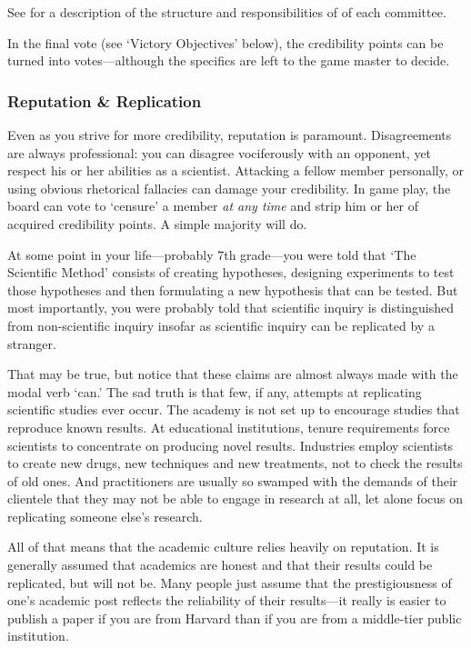 \begin{refsection}
See  for a description of the structure and responsibilities of of each committee.

In the final vote (see `Victory Objectives' below), the credibility points can be turned into votes—although the specifics are left to the game master to decide. 

\subsubsection{Reputation \& Replication}
\label{reputationreplication}

Even as you strive for more credibility, reputation is paramount. Disagreements are always professional: you can disagree vociferously with an opponent, yet respect his or her abilities as a scientist. Attacking a fellow member personally, or using obvious rhetorical fallacies can damage your credibility. In game play, the board can vote to ‘censure’ a member \emph{at any time} and strip him or her of acquired credibility points. A simple majority will do.

At some point in your life---probably 7th grade---you were told that `The Scientific Method' consists of creating hypotheses, designing experiments to test those hypotheses and then formulating a new hypothesis that can be tested. But most importantly, you were probably told that scientific inquiry is distinguished from non-scientific inquiry insofar as scientific inquiry can be replicated by a stranger. 

That may be true, but notice that these claims are almost always made with the modal verb `can.' The sad truth is that few, if any, attempts at replicating scientific studies ever occur. The academy is not set up to encourage studies that reproduce known results. At educational institutions, tenure requirements force scientists to concentrate on producing novel results. Industries employ scientists to create new drugs, new techniques and new treatments, not to check the results of old ones. And practitioners are usually so swamped with the demands of their clientele that they may not be able to engage in research at all, let alone focus on replicating someone else's research.

All of that means that the academic culture relies heavily on reputation. It is generally assumed that academics are honest and that their results could be replicated, but will not be. Many people just assume that the prestigiousness of one’s academic post reflects the reliability of their results---it really is easier to publish a paper if you are from Harvard than if you are from a middle-tier public institution.


\end{refsection}
